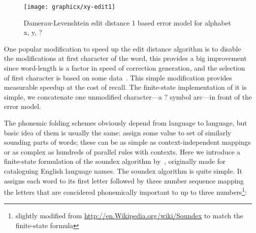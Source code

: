 \documentclass[a4paper,12pt]{article}
\begin{document}
\begin{figure}
    \centering
    \texttt{[image: graphicx/xy-edit1]}
    \caption{Damerau-Levenshtein edit distance 1 based error model for
        alphabet {x, y, ?}
    \label{fig:xy-edit-1}}
\end{figure}

One popular modification to speed up the edit distance algorithm is to disable
the modifications at first character of the word, this provides a big
improvement since word-length is a factor in speed of correction generation,
and the selection of first character is based on some
data~\cite[]{bhagat2007spelling}.  This simple modification provides measurable
speedup at the cost of recall. The finite-state implementation of it is simple,
we concatenate one unmodified character---a $?$ symbol arc---in front of the
error model.

The phonemic folding schemes obviously depend from language to language, but
basic idea of them is usually the same: assign some value to set of similarly
sounding parts of words; these can be as simple as context-independent mappings
or as complex as hundreds of parallel rules with contexts. Here we introduce a
finite-state formulation of the soundex algorithm by~\cite{russell1918soundex},
originally made for cataloguing English language names. The soundex algorithm
is quite simple. It assigns each word to its first letter followed by three
number sequence mapping the letters that are concidered phonemically important
to up to three numbers\footnote{slightly modified from
\url{http://en.Wikipedia.org/wiki/Soundex} to match the finite-state formula}:
\end{document}
